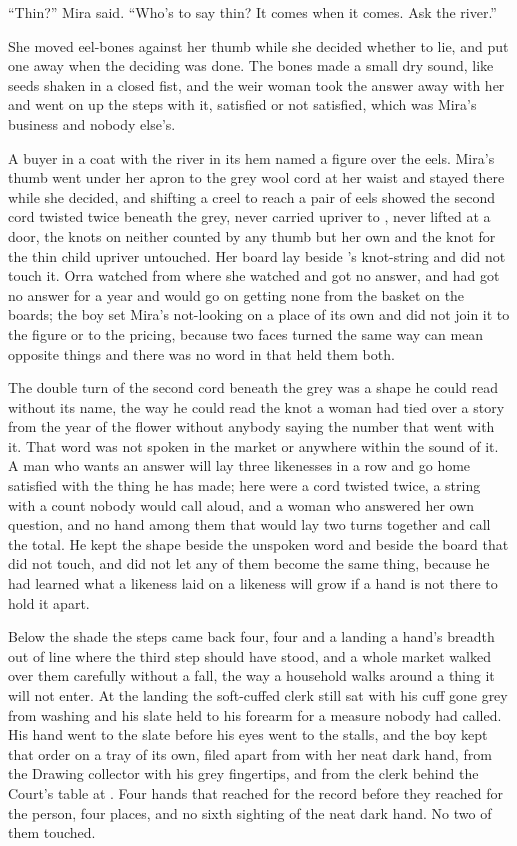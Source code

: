 “Thin?” Mira said. “Who's to say thin? It comes when it comes. Ask the river.”

She moved eel-bones against her thumb while she decided whether to lie, and put one away when the deciding was done. The bones made a small dry sound, like seeds shaken in a closed fist, and the weir woman took the answer away with her and went on up the steps with it, satisfied or not satisfied, which was Mira's business and nobody else's.

A buyer in a coat with the river in its hem named a figure over the eels. Mira's thumb went under her apron to the grey wool cord at her waist and stayed there while she decided, and shifting a creel to reach a pair of eels showed the second cord twisted twice beneath the grey, never carried upriver to , never lifted at a door, the knots on neither counted by any thumb but her own and the knot for the thin child upriver untouched. Her board lay beside 's knot-string and did not touch it. Orra watched from where she watched and got no answer, and had got no answer for a year and would go on getting none from the basket on the boards; the boy set Mira's not-looking on a place of its own and did not join it to the figure or to the pricing, because two faces turned the same way can mean opposite things and there was no word in  that held them both.

The double turn of the second cord beneath the grey was a shape he could read without its name, the way he could read the knot a woman had tied over a story from the year of the flower without anybody saying the number that went with it. That word was not spoken in the market or anywhere within the sound of it. A man who wants an answer will lay three likenesses in a row and go home satisfied with the thing he has made; here were a cord twisted twice, a string with a count nobody would call aloud, and a woman who answered her own question, and no hand among them that would lay two turns together and call the total. He kept the shape beside the unspoken word and beside the board that did not touch, and did not let any of them become the same thing, because he had learned what a likeness laid on a likeness will grow if a hand is not there to hold it apart.

Below the shade the steps came back four, four and a landing a hand's breadth out of line where the third step should have stood, and a whole market walked over them carefully without a fall, the way a household walks around a thing it will not enter. At the landing the soft-cuffed clerk still sat with his cuff gone grey from washing and his slate held to his forearm for a measure nobody had called. His hand went to the slate before his eyes went to the stalls, and the boy kept that order on a tray of its own, filed apart from  with her neat dark hand, from the Drawing collector with his grey fingertips, and from the clerk behind the Court's table at . Four hands that reached for the record before they reached for the person, four places, and no sixth sighting of the neat dark hand. No two of them touched.

